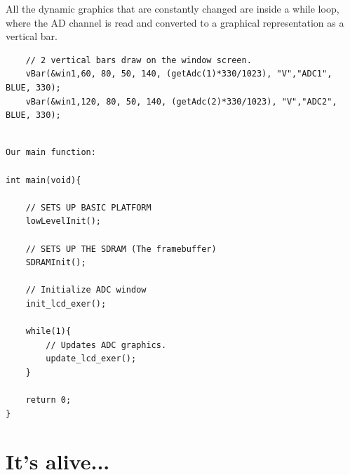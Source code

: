 All the dynamic graphics that are constantly changed are inside a while loop, where the AD channel is read and converted to a graphical representation as a vertical bar.

\begin{lstlisting}
	// 2 vertical bars draw on the window screen.
	vBar(&win1,60, 80, 50, 140, (getAdc(1)*330/1023), "V","ADC1", BLUE, 330);
	vBar(&win1,120, 80, 50, 140, (getAdc(2)*330/1023), "V","ADC2", BLUE, 330);
	
\end{lstlisting}


\begin{lstlisting}
Our main function:

int main(void){

	// SETS UP BASIC PLATFORM
	lowLevelInit(); 		
	
	// SETS UP THE SDRAM (The framebuffer)
	SDRAMInit(); 

	// Initialize ADC window
	init_lcd_exer();

	while(1){
		// Updates ADC graphics.
		update_lcd_exer();
	}

	return 0;
}
\end{lstlisting}


\section{It's alive...}



